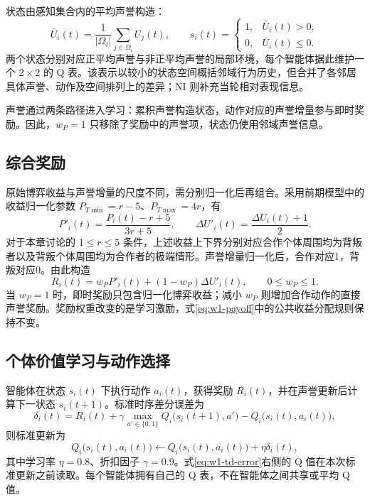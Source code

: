 状态由感知集合内的平均声誉构造：
\begin{equation}
 \bar U_i(t)=\frac{1}{|\Omega_i|}\sum_{j\in\Omega_i}U_j(t),\qquad
 s_i(t)=\begin{cases}1,&\bar U_i(t)>0,\\0,&\bar U_i(t)\leq0.\end{cases}
 \label{eq:w1-state}
\end{equation}
两个状态分别对应正平均声誉与非正平均声誉的局部环境，每个智能体据此维护一个 $2\times2$ 的 Q 表。该表示以较小的状态空间概括邻域行为历史，但合并了各邻居具体声誉、动作及空间排列上的差异；NI 则补充当轮相对表现信息。

声誉通过两条路径进入学习：累积声誉构造状态，动作对应的声誉增量参与即时奖励。因此，$w_P=1$ 只移除了奖励中的声誉项，状态仍使用邻域声誉信息。

\subsection{综合奖励}

原始博弈收益与声誉增量的尺度不同，需分别归一化后再组合。采用前期模型中的收益归一化参数 $P_{T\min}=r-5$、$P_{T\max}=4r$，有
\begin{equation}
 P'_i(t)=\frac{P_i(t)-r+5}{3r+5},\qquad
 \Delta U'_i(t)=\frac{\Delta U_i(t)+1}{2}.
 \label{eq:w1-normalization}
\end{equation}
对于本章讨论的 $1\leq r\leq5$ 条件，上述收益上下界分别对应合作个体周围均为背叛者以及背叛个体周围均为合作者的极端情形。声誉增量归一化后，合作对应1，背叛对应0。由此构造
\begin{equation}
 R_i(t)=w_P P'_i(t)+(1-w_P)\Delta U'_i(t),\qquad 0\leq w_P\leq1.
 \label{eq:w1-reward}
\end{equation}
当 $w_P=1$ 时，即时奖励只包含归一化博弈收益；减小 $w_P$ 则增加合作动作的直接声誉奖励。奖励权重改变的是学习激励，式\eqref{eq:w1-payoff}中的公共收益分配规则保持不变。

\subsection{个体价值学习与动作选择}

智能体在状态 $s_i(t)$ 下执行动作 $a_i(t)$，获得奖励 $R_i(t)$，并在声誉更新后计算下一状态 $s_i(t+1)$。标准时序差分误差为
\begin{equation}
 \delta_i(t)=R_i(t)+\gamma\max_{a'\in\{0,1\}}Q_i\bigl(s_i(t+1),a'\bigr)
             -Q_i\bigl(s_i(t),a_i(t)\bigr),
 \label{eq:w1-td-error}
\end{equation}
则标准更新为
\begin{equation}
 Q_i\bigl(s_i(t),a_i(t)\bigr)\leftarrow
 Q_i\bigl(s_i(t),a_i(t)\bigr)+\eta\delta_i(t),
 \label{eq:w1-q-update}
\end{equation}
其中学习率 $\eta=0.8$、折扣因子 $\gamma=0.9$。式\eqref{eq:w1-td-error}右侧的 Q 值在本次标准更新之前读取。每个智能体拥有自己的 Q 表，不在智能体之间共享或平均 Q 值。

